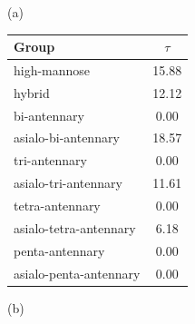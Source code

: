     \begin{table}
        \begin{minipage}[t]{0.25\linewidth}
            \vspace{0pt}
            (a)
            \centering
            
    \begin{tabular}{l | c}
        Group & $\tau$ \\
        \hline
        high-mannose & 15.88 \\
        hybrid & 12.12 \\
        bi-antennary & 0.00 \\
        asialo-bi-antennary & 18.57 \\
        tri-antennary & 0.00 \\
        asialo-tri-antennary & 11.61 \\
        tetra-antennary & 0.00 \\
        asialo-tetra-antennary & 6.18 \\
        penta-antennary & 0.00 \\
        asialo-penta-antennary & 0.00 \\
    \end{tabular}
    
            
        \end{minipage}
        \hspace{1cm}
        \begin{minipage}[t]{0.55\linewidth}
            \vspace{0pt}
            (b)
            \centering
            

\end{minipage}
\end{table}

